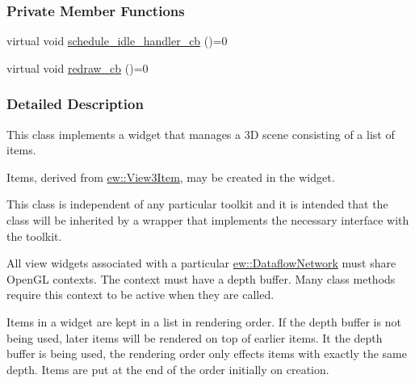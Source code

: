 \subsubsection*{Private Member Functions}
\begin{DoxyCompactItemize}
\item 
virtual void \hyperlink{classew_1_1View3Widget_a7b2407e3f2dbda8cc8bb7aed646c07fb}{schedule\_\-idle\_\-handler\_\-cb} ()=0
\item 
virtual void \hyperlink{classew_1_1View3Widget_a07646a3ab6c2cb89907df00e21825fa3}{redraw\_\-cb} ()=0
\end{DoxyCompactItemize}


\subsubsection{Detailed Description}
This class implements a widget that manages a 3D scene consisting of a list of items.

Items, derived from \hyperlink{classew_1_1View3Item}{ew::View3Item}, may be created in the widget.

This class is independent of any particular toolkit and it is intended that the class will be inherited by a wrapper that implements the necessary interface with the toolkit.

All view widgets associated with a particular \hyperlink{classew_1_1DataflowNetwork}{ew::DataflowNetwork} must share OpenGL contexts. The context must have a depth buffer. Many class methods require this context to be active when they are called.

Items in a widget are kept in a list in rendering order. If the depth buffer is not being used, later items will be rendered on top of earlier items. It the depth buffer is being used, the rendering order only effects items with exactly the same depth. Items are put at the end of the order initially on creation. 


